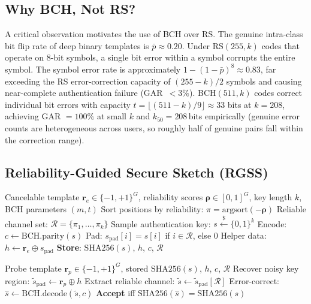\documentclass[journal]{IEEEtran}
\begin{document}
\subsection{Why BCH, Not RS?}
\label{sec:method:bch}

A critical observation motivates the use of BCH over RS.
The genuine intra-class bit flip rate of deep binary templates is
$\bar{p} \approx 0.20$.
Under RS$(255,k)$ codes that operate on 8-bit symbols, a single
bit error within a symbol corrupts the entire symbol.
The symbol error rate is approximately
$1 - (1-\bar{p})^8 \approx 0.83$, far exceeding the RS
error-correction capacity of $(255-k)/2$ symbols and causing
near-complete authentication failure (GAR~$<3\%$).
BCH$(511,k)$ codes correct individual bit errors with capacity
$t = \lfloor(511-k)/9\rfloor \approx 33$ bits at $k\!=\!208$,
achieving GAR $= 100\%$ at small $k$ and $k_{50}\!=\!208$\,bits
empirically (genuine error counts are heterogeneous across users,
so roughly half of genuine pairs fall within the correction range).

\subsection{Reliability-Guided Secure Sketch (RGSS)}
\label{sec:method:rgss}

\begin{algorithm}[!t]
  \caption{RGSS Enrollment}
  \label{alg:enroll}
  \begin{algorithmic}[1]
    \REQUIRE Cancelable template $\mathbf{r}_e \in \{-1,+1\}^G$,
             reliability scores $\boldsymbol{\rho} \in [0,1]^G$,
             key length $k$, BCH parameters $(m,t)$
    \STATE Sort positions by reliability:
           $\pi = \text{argsort}(-\boldsymbol{\rho})$
    \STATE Reliable channel set: $\mathcal{R} = \{\pi_1,\ldots,\pi_k\}$
    \STATE Sample authentication key: $s \xleftarrow{\$} \{0,1\}^k$
    \STATE Encode: $c \leftarrow \text{BCH.parity}(s)$
    \STATE Pad: $s_\text{pad}[i] = s[i]$ if $i \in \mathcal{R}$,
           else $0$
    \STATE Helper data: $h \leftarrow \mathbf{r}_e \oplus s_\text{pad}$
    \STATE \textbf{Store}: $\text{SHA256}(s)$, $h$, $c$, $\mathcal{R}$
  \end{algorithmic}
\end{algorithm}

\begin{algorithm}[!t]
  \caption{RGSS Verification}
  \label{alg:verify}
  \begin{algorithmic}[1]
    \REQUIRE Probe template $\mathbf{r}_p \in \{-1,+1\}^G$,
             stored $\text{SHA256}(s)$, $h$, $c$, $\mathcal{R}$
    \STATE Recover noisy key region:
           $\tilde{s}_\text{pad} \leftarrow \mathbf{r}_p \oplus h$
    \STATE Extract reliable channel: $\tilde{s} \leftarrow
           \tilde{s}_\text{pad}[\mathcal{R}]$
    \STATE Error-correct: $\hat{s} \leftarrow \text{BCH.decode}(\tilde{s}, c)$
    \STATE \textbf{Accept} iff $\text{SHA256}(\hat{s}) = \text{SHA256}(s)$
  \end{algorithmic}
\end{algorithm}
\end{document}
